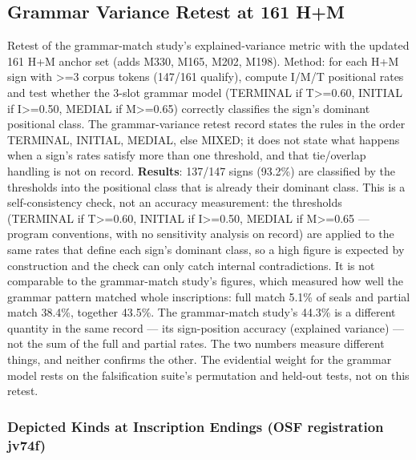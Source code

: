 \documentclass[11pt]{article}
\begin{document}
\subsection{Grammar Variance Retest at 161 H+M
}\label{grammar-variance-retest-phase-170}

Retest of the grammar-match study's explained-variance metric with the
updated 161 H+M anchor set (adds M330, M165, M202, M198). Method:
for each H+M sign with \textgreater{}=3 corpus tokens (147/161 qualify), compute
I/M/T positional rates and test whether the 3-slot grammar model
(TERMINAL if T\textgreater{}=0.60, INITIAL if I\textgreater{}=0.50, MEDIAL if M\textgreater{}=0.65)
correctly classifies the sign's dominant positional class. The grammar-variance retest record states the rules in the order TERMINAL, INITIAL, MEDIAL, else MIXED; it does not state what happens when a sign's rates satisfy more than one threshold, and that tie/overlap handling is not on record.
\textbf{Results}: 137/147 signs (93.2\%) are classified by the thresholds into the positional class that is already their dominant class. This is a self-consistency check, not an accuracy measurement: the thresholds (TERMINAL if T\textgreater{}=0.60, INITIAL if I\textgreater{}=0.50, MEDIAL if M\textgreater{}=0.65 --- program conventions, with no sensitivity analysis on record) are applied to the same rates that define each sign's dominant class, so a high figure is expected by construction and the check can only catch internal contradictions. It is not comparable to the grammar-match study's figures, which measured how well the grammar pattern matched whole inscriptions: full match 5.1\% of seals and partial match 38.4\%, together 43.5\%. The grammar-match study's 44.3\% is a different quantity in the same record --- its sign-position accuracy (explained variance) --- not the sum of the full and partial rates. The two numbers measure different things, and neither confirms the other. The evidential weight for the grammar model rests on the falsification suite's permutation and held-out tests, not on this retest.

\subsubsection{Depicted Kinds at Inscription Endings
(OSF registration jv74f)}\label{depicted-kinds-at-inscription-endings-spec-075}
\end{document}
